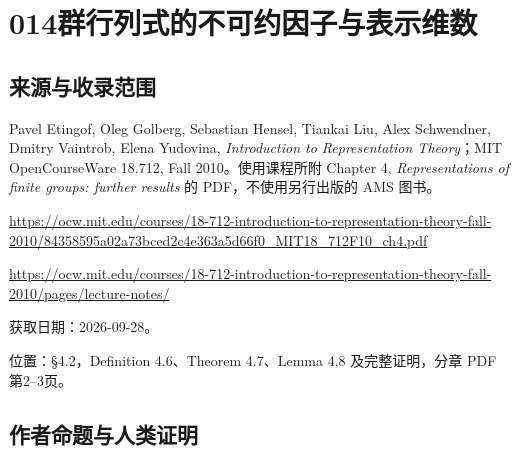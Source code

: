 \documentclass[UTF8,11pt]{ctexart}
\theoremstyle{definition}
\begin{document}
\section*{014\quad 群行列式的不可约因子与表示维数}
\subsection*{来源与收录范围}
Pavel Etingof, Oleg Golberg, Sebastian Hensel, Tiankai Liu, Alex Schwendner, Dmitry Vaintrob, Elena Yudovina, \emph{Introduction to Representation Theory}；MIT OpenCourseWare 18.712, Fall 2010。使用课程所附 Chapter 4, \emph{Representations of finite groups: further results} 的 PDF，不使用另行出版的 AMS 图书。
\par\url{https://ocw.mit.edu/courses/18-712-introduction-to-representation-theory-fall-2010/84358595a02a73bced2c4e363a5d66f0_MIT18_712F10_ch4.pdf}
\par\url{https://ocw.mit.edu/courses/18-712-introduction-to-representation-theory-fall-2010/pages/lecture-notes/}
\par 获取日期：2026-09-28。\par 位置：\S4.2，Definition 4.6、Theorem 4.7、Lemma 4.8 及完整证明，分章 PDF 第2--3页。
\subsection*{作者命题与人类证明}
\end{document}
